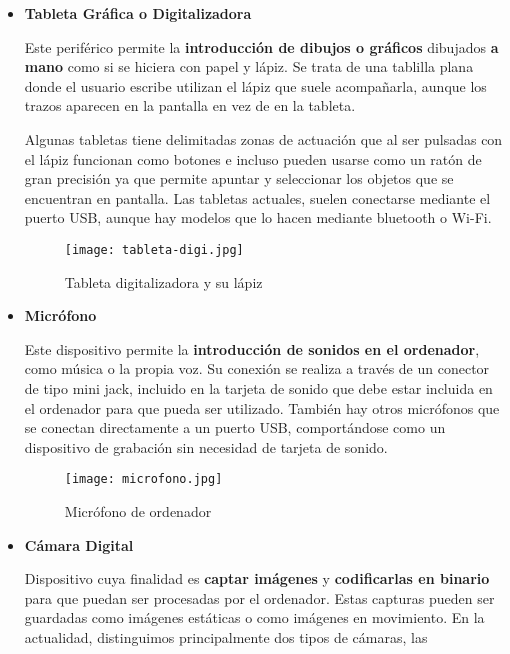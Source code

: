 \begin{itemize}
    \item \textbf{Tableta Gráfica o Digitalizadora}

    Este periférico permite la \textbf{introducción de dibujos o gráficos} dibujados \textbf{a mano} como si se hiciera con papel y lápiz. Se trata de una tablilla plana donde el usuario escribe utilizan el lápiz que suele acompañarla, aunque los trazos aparecen en la pantalla en vez de en la tableta.

    Algunas tabletas tiene delimitadas zonas de actuación que al ser pulsadas con el lápiz funcionan como botones e incluso pueden usarse como un ratón de gran precisión ya que permite apuntar y seleccionar los objetos que se encuentran en pantalla. Las tabletas actuales, suelen conectarse mediante el puerto USB, aunque hay modelos que lo hacen mediante bluetooth o Wi-Fi.

     \vspace{4ex}

    \begin{figure}[ht]
        \centering
        \texttt{[image: tableta-digi.jpg]}
        \caption{Tableta digitalizadora y su lápiz}
    \end{figure}

    \item  \textbf{Micrófono}

    Este dispositivo permite la \textbf{introducción de sonidos en el ordenador}, como música o la propia voz. Su conexión se realiza a través de un conector de tipo mini jack, incluido en la tarjeta de sonido que debe estar incluida en el ordenador para que pueda ser utilizado. También hay otros micrófonos que se conectan directamente a un puerto USB, comportándose como un dispositivo de grabación sin necesidad de tarjeta de sonido.

    \vspace{4ex}

    \begin{figure}[ht]
        \centering
        \texttt{[image: microfono.jpg]}
        \caption{Micrófono de ordenador}
    \end{figure}

    \item \textbf{Cámara Digital}

    Dispositivo cuya finalidad es \textbf{captar imágenes} y \textbf{codificarlas en binario} para que puedan ser procesadas por el ordenador. Estas capturas pueden ser guardadas como imágenes estáticas o como imágenes en movimiento. En la actualidad, distinguimos principalmente dos tipos de cámaras, las
\end{itemize}












\glsaddall
\printglossaries


\newpage
{}



